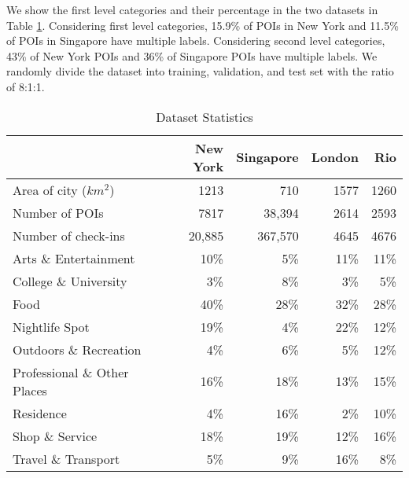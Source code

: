 We show the first level categories and their percentage in the two datasets
in Table \ref{tab:CategoryInfo}. Considering first level categories, 15.9\% of POIs in New York
and 11.5\% of POIs in Singapore have multiple labels.
Considering second level categories, 43\% of New York POIs and 36\% of Singapore POIs have multiple labels.
We randomly divide the dataset into training, validation, and test set with the ratio of 8:1:1.

\begin{table}
\caption{Dataset Statistics}
\centering
\label{tab:CategoryInfo}
\begin{tabular}{lrrrr}
\hline
 & New York& Singapore & London & Rio \\
\hline
Area of city ($km^2$) & 1213 & 710 & 1577 & 1260 \\

Number of POIs & 7817 & 38,394& 2614& 2593 \\

Number of check-ins & 20,885 & 367,570 & 4645& 4676\\
\hline
Arts \& Entertainment &       10\% &        5\% &        11\% &       11\% \\

College \& University &        3\% &        8\% &        3\%&       5\% \\

      Food &       40\% &       28\%&        32\% &       28\% \\

Nightlife Spot &       19\% &        4\% &        22\%&       12\% \\

Outdoors \& Recreation &        4\% &        6\%  &        5\%&       12\%\\

Professional \& Other Places &       16\% &       18\% &        13\% &       15\%\\

 Residence &        4\% &       16\% &        2\%&       10\% \\

Shop \& Service &       18\% &       19\%  &        12\%&       16\%\\

Travel \& Transport &        5\% &        9\% &        16\%&       8\% \\
\hline
\end{tabular}
\end{table}

